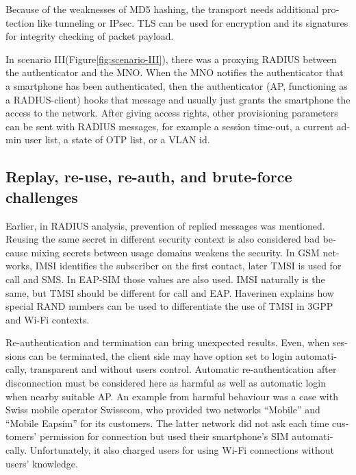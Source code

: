 \documentclass[12pt,a4paper,english]{tutthesis}
\begin{document}
\begin{otherlanguage}{english}
Because of the weaknesses of MD5 hashing, the transport needs additional protection
like tunneling or IPsec. TLS can be used for encryption and its
signatures for integrity checking of packet payload.





In scenario III(Figure\ref{fig:scenario-III}),  there was a proxying RADIUS
between the authenticator
and the MNO.  When the MNO notifies the authenticator
that a smartphone has been authenticated, then the authenticator (AP, functioning
as a RADIUS-client) hooks that message and usually just grants the
smartphone the access to the network. After giving access rights, other
provisioning parameters can be sent with RADIUS messages, for example
a session time-out,
a current admin user list, a state of OTP list, or a VLAN id.


\subsection{Replay, re-use, re-auth, and brute-force challenges}
\label{sec-6-1-5}

Earlier, in RADIUS analysis, prevention of replied messages was
mentioned. Reusing the same secret in different security context is also
considered bad because mixing secrets between usage
domains weakens the security.  In GSM networks, IMSI identifies the subscriber on
the first contact, later TMSI is used for call and SMS.  In EAP-SIM those
values are also used. IMSI naturally is the same, but TMSI should be
different for call and EAP.  Haverinen \cite{hav-doc} explains how
special RAND numbers can be used to differentiate the use of TMSI in 3GPP and Wi-Fi
contexts.

Re-authentication and termination can bring unexpected results.
Even, when sessions can be terminated, the client side may have 
option set to login automatically, transparent and without users control.
Automatic re-authentication after disconnection  must be considered
here as harmful as well as automatic login when nearby suitable AP. An
example from harmful behaviour was a case with  Swiss mobile operator Swisscom, who
 provided two networks ``Mobile'' and ``Mobile Eapsim''  for its
customers. 
The latter network did not ask each time customers' permission for
connection but used their smartphone's SIM
automatically. Unfortunately, it also charged users for using Wi-Fi
connections without users' knowledge. \cite{swisscom}




\end{otherlanguage}
\end{document}
